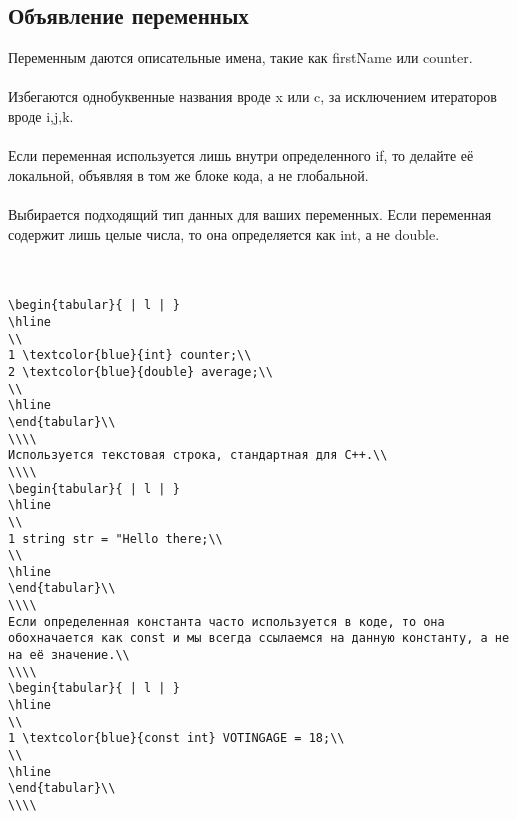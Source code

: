 \documentclass{article}
\begin{document}
\subsection{Объявление переменных}
Переменным даются описательные имена, такие как firstName или counter.\\
\\
Избегаются однобуквенные названия вроде x или c, за исключением итераторов вроде i,j,k.\\
\\
Если переменная используется лишь внутри определенного if, то делайте её локальной, объявляя в том же блоке кода, а не глобальной.\\
\\
Выбирается подходящий тип данных для ваших переменных. Если переменная содержит лишь целые числа, то она определяется как int, а не double.\\
\\\\
\begin{lstlisting}
\begin{tabular}{ | l | }
\hline
\\
1 \textcolor{blue}{int} counter;\\
2 \textcolor{blue}{double} average;\\
\\
\hline
\end{tabular}\\
\\\\
Используется текстовая строка, стандартная для C++.\\
\\\\
\begin{tabular}{ | l | }
\hline
\\
1 string str = "Hello there;\\
\\
\hline
\end{tabular}\\
\\\\
Если определенная константа часто используется в коде, то она обохначается как const и мы всегда ссылаемся на данную константу, а не на её значение.\\
\\\\
\begin{tabular}{ | l | }
\hline
\\
1 \textcolor{blue}{const int} VOTINGAGE = 18;\\
\\
\hline
\end{tabular}\\
\\\\
\end{lstlisting}
\end{document}
